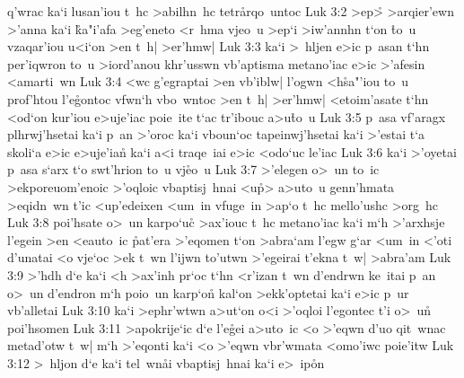 q'wrac
ka`i
lusan'iou
t~hc
>abilhn~hc
tetr\r{a}rqo~untoc\bibvsend
\vs Luk 3:2
>ep>\r{}
>arqier'ewn
>'anna
ka`i
\r{k}a"i'afa
>eg'eneto
<r~hma
vjeo~u
>ep`i
>iw'annhn
t`on
\r{t}o~u
vzaqar'iou
u<i`on
>en
t~h|
>er'hmw|\bibvsend
\vs Luk 3:3
ka`i
>~hljen
e>ic
p~asan
t`hn
per'iqwron
to~u
>iord'anou
khr'usswn
vb'aptisma
metano'iac
e>ic
>'afesin
<amarti~wn\bibvsend
\vs Luk 3:4
<wc
g'egraptai
>en
vb'iblw|
l'ogwn
<h\r{s}a"'iou
to~u
prof'htou
l'e\r{g}ontoc
vfwn`h
vbo~wntoc
>en
t~h|
>er'hmw|
<etoim'asate
t`hn
<od`on
kur'iou
e>uje'iac
poie~ite
t`ac
tr'ibouc
a>u\r{t}o~u\bibvsend
{}
\vs Luk 3:5
p~asa
vf'aragx
plhrwj'hsetai
ka`i
p~an
>'oroc
ka`i
vboun`oc
tapeinwj'hsetai
ka`i
>'estai
t`a
skoli`a
e>ic
e>uje'ia\r{n}
ka`i
a<i
traqe~iai
e>ic
<odo`uc
le'iac\bibvsend
\vs Luk 3:6
ka`i
>'oyetai
p~asa
s`arx
t`o
swt'hrion
to~u
vj\r{e}o~u\bibvsend
{}
\vs Luk 3:7
>'elegen
o>~un
to~ic
>ekporeuom'enoic
>'oqloic
vbaptisj~hnai
<u\r{p}>
a>uto~u
genn'hmata
>eqidn~wn
t'ic
<up'edeixen
<um~in
vfuge~in
>ap`o
t~hc
mello'ushc
>org~hc\bibvsend
\vs Luk 3:8
poi'hsate
o>~un
karpo`uc\r{}
>ax'iouc
t~hc
metano'iac
ka`i
m`h
>'arxhsje
l'egein
>en
<eauto~ic
\r{p}at'era
>'eqomen
t`on
>abra`am
l'egw
g`ar
<um~in
<'oti
d'unatai
<o
vje`oc
>ek
t~wn
l'ijwn
to'utwn
>'egeirai
t'ekna
t~w|
>abra'am\bibvsend
\vs Luk 3:9
>'hdh
d`e
ka`i
<h
>ax'inh
pr`oc
t`hn
<r'izan
t~wn
d'endrwn
ke~itai
p~an
o>~un
d'endron
m`h
poio~un
karp`on\r{}
kal`on
>ekk'optetai
ka`i
e>ic
p~ur
vb'alletai\bibvsend
\vs Luk 3:10
ka`i
>ephr'wtwn
a>ut`on
o<i
>'oqloi
l'egontec
t'i
o>~un\r{}
poi'hsomen\bibvsend
\vs Luk 3:11
>apokrije`ic
d`e
l'e\r{g}ei
a>uto~ic
<o
>'eqwn
d'uo
qit~wnac
metad'otw
t~w|
m`h
>'eqonti
ka`i
<o
>'eqwn
vbr'wmata
<omo'iwc
poie'itw\bibvsend
\vs Luk 3:12
>~hljon
d`e
ka`i
tel~wn\r{a}i
vbaptisj~hnai
ka`i
e>~ip\r{o}n
